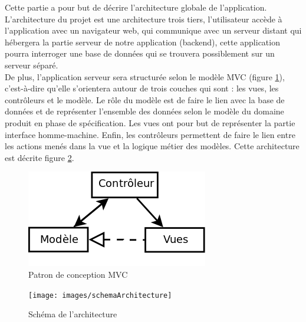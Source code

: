 Cette partie a pour but de décrire l'architecture globale de l'application.\\

L'architecture du projet est une architecture trois tiers, l'utilisateur accède à l'application avec un navigateur web, qui communique avec un serveur distant qui hébergera la partie serveur de notre application (backend), cette application pourra interroger une base de données qui se trouvera possiblement sur un serveur séparé.\\

De plus, l'application serveur sera structurée selon le modèle MVC (figure \ref{MVC}), c'est-à-dire qu'elle s'orientera autour de trois couches qui sont : les vues, les contrôleurs et le modèle. Le rôle du modèle est de faire le lien avec la base de données et de représenter l'ensemble des données selon le modèle du domaine produit en phase de spécification. Les vues ont pour but de représenter la partie interface homme-machine. Enfin, les contrôleurs permettent de faire le lien entre les actions menés dans la vue et la logique métier des modèles. Cette architecture est décrite figure \ref{archi_schema}.


\begin{figure}[!h]
	\begin{center}
	\includegraphics[scale=0.3]{images/MVC}
	\caption{\label{MVC} Patron de conception MVC}
	\end{center}
\end{figure}

\begin{figure}[!h]
	\begin{center}
	\texttt{[image: images/schemaArchitecture]}
	\caption{\label{archi_schema} Schéma de l'architecture}
	\end{center}
\end{figure}